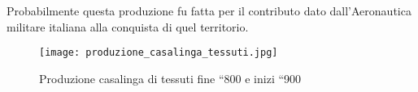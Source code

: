 Probabilmente questa produzione fu fatta per il contributo dato dall’Aeronautica militare italiana alla conquista di quel territorio. 

\newpage

\begin{figure}[h]
	\centering
		\texttt{[image: produzione\_casalinga\_tessuti.jpg]}
	\caption{Produzione casalinga di tessuti fine “800 e inizi “900}
	\label{fig:produzione_casalinga_tessuti}
\end{figure}

\clearpage









































